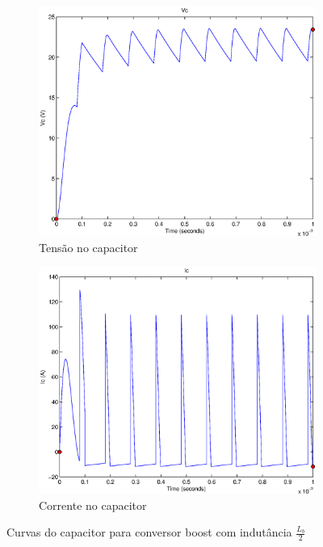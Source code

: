 \documentclass{article}
\begin{document}
\begin{figure}[H]
	\centering
	\begin{subfigure}[b]{0.4\linewidth}
		\includegraphics[width=\linewidth]{matlab/boost/b_vc2}
		\caption{Tensão no capacitor}
	\end{subfigure}
	\begin{subfigure}[b]{0.4\linewidth}
		\centering
		\includegraphics[width=\linewidth]{matlab/boost/b_ic2}
		\caption{Corrente no capacitor}
	\end{subfigure}
	\caption{Curvas do capacitor para conversor boost com indutância $\frac{L_b}{2}$}
	\label{fig:boc2}
\end{figure}
\end{document}
